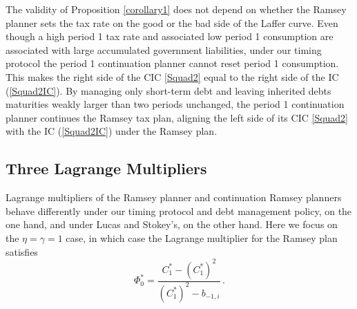 \documentclass[12pt]{article}
\newcommand{\WJ}[1]{{\textcolor{red}{#1}}}
\begin{document}




{The validity of Proposition  \ref{corollary1} does not depend on  whether the Ramsey planner sets the tax rate on the good or the bad side  of  the Laffer curve. 
Even though a high period 1 tax rate and associated low period 1 consumption are associated with large accumulated government  liabilities,  under   our timing protocol the period 1 continuation planner cannot reset   period 1 consumption.} This makes the right side of the CIC \eqref{Squad2} equal to the right side of the IC (\ref{Squad2IC}). By managing only short-term debt and leaving 
	inherited debts  maturities weakly larger than two periods  {unchanged}, the period 1 continuation  planner  continues the Ramsey tax plan,  aligning  the left side of its CIC \eqref{Squad2} with the IC  (\ref{Squad2IC}) under the Ramsey plan. %


\subsection{{Three} Lagrange Multipliers} 
\label{subLM} 

 Lagrange multipliers of the Ramsey planner and continuation Ramsey planners behave differently under our timing protocol  and debt management policy, on the one hand,  and under    Lucas and Stokey's, on the other hand.    Here we focus on the   $\eta=\gamma=1$ case, in which case 
	the  Lagrange multiplier for the Ramsey plan satisfies %
		\begin{equation} \label{PhiRamsey} 
		{\Phi}_0^\ast= \frac{C_1^*-(C_1^*)^2}{(C_1^*)^2-b_{-1, i}}\,.
	\end{equation}
	
\end{document}
